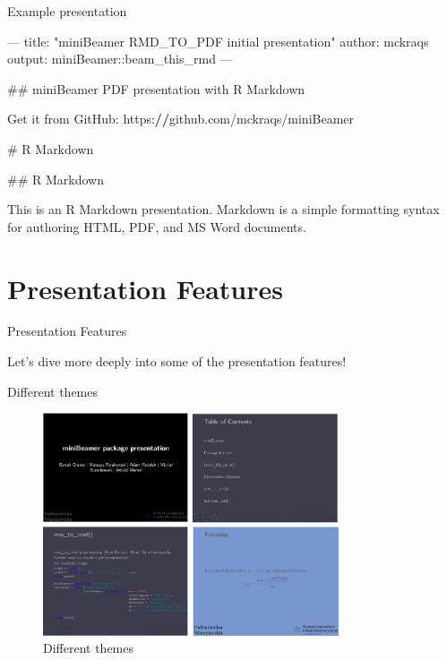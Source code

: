\documentclass[ignorenonframetext,]{beamer}
\newenvironment{Shaded}{}{}
\newcommand{\StringTok}[1]{\textcolor[rgb]{0.00,0.50,0.50}{#1}}
\newcommand{\CommentTok}[1]{\textcolor[rgb]{0.00,0.50,0.00}{#1}}
\newcommand{\ControlFlowTok}[1]{\textcolor[rgb]{0.00,0.00,1.00}{#1}}
\newcommand{\OperatorTok}[1]{#1}
\newcommand{\ErrorTok}[1]{\textcolor[rgb]{1.00,0.00,0.00}{\textbf{#1}}}
\newcommand{\NormalTok}[1]{#1}
\begin{document}
\begin{frame}[fragile]{Example presentation}

\scriptsize

\begin{Shaded}
\begin{Highlighting}[]
\OperatorTok{---}
\NormalTok{title}\OperatorTok{:}\StringTok{ "miniBeamer RMD_TO_PDF initial presentation"}
\NormalTok{author}\OperatorTok{:}\StringTok{ }\NormalTok{mckraqs}
\NormalTok{output}\OperatorTok{:}\StringTok{ }\NormalTok{miniBeamer}\OperatorTok{::}\NormalTok{beam_this_rmd}
\OperatorTok{---}

\NormalTok{## miniBeamer PDF presentation with R Markdown}

\NormalTok{Get it from GitHub}\OperatorTok{:}\StringTok{ }\NormalTok{https}\OperatorTok{:}\ErrorTok{//}\NormalTok{github.com}\OperatorTok{/}\NormalTok{mckraqs}\OperatorTok{/}\NormalTok{miniBeamer}

\CommentTok{# R Markdown}

\NormalTok{## R Markdown}

\NormalTok{This is an R Markdown presentation. Markdown is a simple formatting syntax}
\ControlFlowTok{for}\NormalTok{ authoring HTML, PDF, and MS Word documents.}
\end{Highlighting}
\end{Shaded}

\end{frame}

\section{Presentation Features}\label{presentation-features}

\begin{frame}{Presentation Features}

Let's dive more deeply into some of the presentation features!

\end{frame}

\begin{frame}{Different themes}

\begin{figure}
\centering
\includegraphics[width=3.43750in]{themes2.png}
\caption{Different themes}
\end{figure}

\end{frame}
\end{document}
